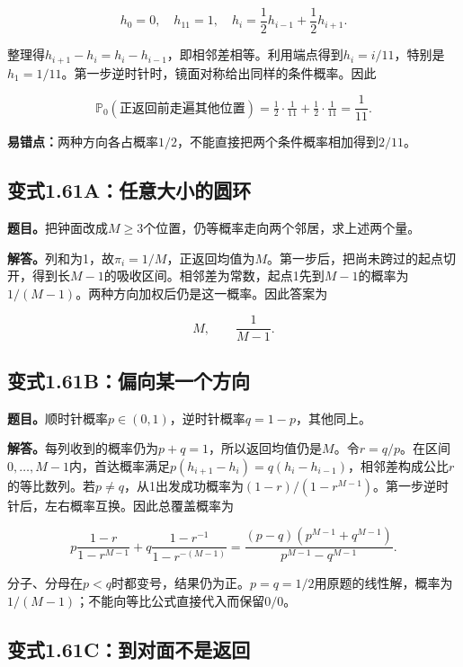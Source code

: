 \documentclass[
  11pt,a4paper,UTF8,fontset=fandol]{ctexart}
\begin{document}
\[
h_0=0,\quad h_{11}=1,\quad h_i=\frac12h_{i-1}+\frac12h_{i+1}.
\]

整理得\(h_{i+1}-h_i=h_i-h_{i-1}\)，即相邻差相等。利用端点得到\(h_i=i/11\)，特别是\(h_1=1/11\)。第一步逆时针时，镜面对称给出同样的条件概率。因此

\[
\boxed{\mathbb P_0(\text{正返回前走遍其他位置})
=\tfrac12\cdot\tfrac1{11}+\tfrac12\cdot\tfrac1{11}=\frac1{11}.}
\]

\textbf{易错点：}两种方向各占概率\(1/2\)，不能直接把两个条件概率相加得到\(2/11\)。

\subsection{变式1.61A：任意大小的圆环}\label{ux53d8ux5f0f1.61aux4efbux610fux5927ux5c0fux7684ux5706ux73af}

\textbf{题目。}把钟面改成\(M\ge3\)个位置，仍等概率走向两个邻居，求上述两个量。

\textbf{解答。}列和为1，故\(\pi_i=1/M\)，正返回均值为\(M\)。第一步后，把尚未跨过的起点切开，得到长\(M-1\)的吸收区间。相邻差为常数，起点1先到\(M-1\)的概率为\(1/(M-1)\)。两种方向加权后仍是这一概率。因此答案为

\[\boxed{M,\qquad\frac1{M-1}.}\]

\subsection{变式1.61B：偏向某一个方向}\label{ux53d8ux5f0f1.61bux504fux5411ux67d0ux4e00ux4e2aux65b9ux5411}

\textbf{题目。}顺时针概率\(p\in(0,1)\)，逆时针概率\(q=1-p\)，其他同上。

\textbf{解答。}每列收到的概率仍为\(p+q=1\)，所以返回均值仍是\(M\)。令\(r=q/p\)。在区间\(0,\ldots,M-1\)内，首达概率满足\(p(h_{i+1}-h_i)=q(h_i-h_{i-1})\)，相邻差构成公比\(r\)的等比数列。若\(p\ne q\)，从1出发成功概率为\((1-r)/(1-r^{M-1})\)。第一步逆时针后，左右概率互换。因此总覆盖概率为

\[
p\frac{1-r}{1-r^{M-1}}
+q\frac{1-r^{-1}}{1-r^{-(M-1)}}
=\boxed{\frac{(p-q)(p^{M-1}+q^{M-1})}{p^{M-1}-q^{M-1}}}.
\]

分子、分母在\(p<q\)时都变号，结果仍为正。\(p=q=1/2\)用原题的线性解，概率为\(1/(M-1)\)；不能向等比公式直接代入而保留\(0/0\)。

\subsection{变式1.61C：到对面不是返回}\label{ux53d8ux5f0f1.61cux5230ux5bf9ux9762ux4e0dux662fux8fd4ux56de}
\end{document}
